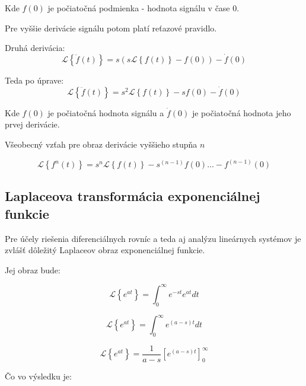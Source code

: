 \documentclass[a4paper,10pt]{article}
\begin{document}
Kde $f(0)$ je počiatočná podmienka - hodnota signálu v čase 0.

Pre vyššie derivácie signálu potom platí reťazové pravidlo.

Druhá derivácia:
\begin{equation}
\label{eq:LPT druha derivacia}
	\mathcal{L}\left\lbrace\ddot{f}(t) \right\rbrace=s\left(  s\mathcal{L}\left\lbrace f(t)\right\rbrace-f(0) \right)-\dot{f}(0)
\end{equation}

Teda po úprave:
\begin{equation}
\label{eq:LPT nta derivacia}
	\mathcal{L}\left\lbrace\ddot{f}(t) \right\rbrace=s^2 \mathcal{L}\left\lbrace f(t)\right\rbrace -s f(0) -\dot{f}(0)
\end{equation}

Kde $f(0)$ je počiatočná hodnota signálu a $\dot{f}(0)$ je počiatočná hodnota jeho prvej derivácie.

Všeobecný vzťah pre obraz derivácie vyššieho stupňa $n$

\begin{equation}
	\mathcal{L}\left\lbrace f^n(t) \right\rbrace=s^n \mathcal{L}\left\lbrace f(t)\right\rbrace - s^{(n-1)}f(0) \ldots -f^{(n-1)}(0)
\end{equation}


\subsection{Laplaceova transformácia exponenciálnej funkcie}
Pre účely riešenia diferenciálnych rovníc a teda aj analýzu lineárnych systémov je zvlášť dôležitý Laplaceov obraz exponenciálnej funkcie.

Jej obraz bude:

\begin{equation*}
\mathcal{L}\left\lbrace e^{at}\right\rbrace=\int_{0}^{\infty}{e^{-st}e^{at}dt}
\end{equation*}

\begin{equation*}
\mathcal{L}\left\lbrace e^{at}\right\rbrace=\int_{0}^{\infty}{e^{(a-s)t}dt}
\end{equation*}


\begin{equation*}
\mathcal{L}\left\lbrace e^{at}\right\rbrace=\frac{1}{a-s}\left[e^{(a-s)t} \right]_{0}^{\infty}
\end{equation*}

Čo vo výsledku je:
\end{document}
